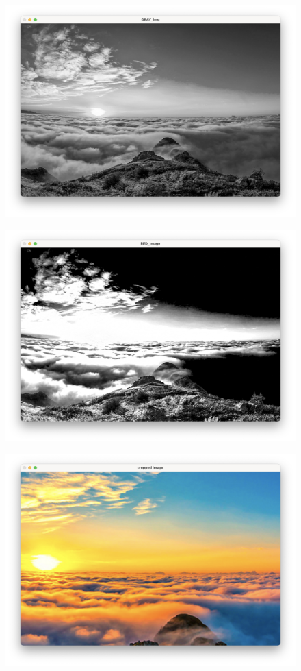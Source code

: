 \documentclass[a4paper, 12pt]{report}
\begin{document}
\begin{figure}
\includegraphics[scale=.39]{6.png}
\centering
\end{figure}
\begin{figure}
\includegraphics[scale=.39]{7.png}
\centering
\end{figure}
\begin{figure}
\includegraphics[scale=.39]{8.png}
\centering
\end{figure}
\end{document}

